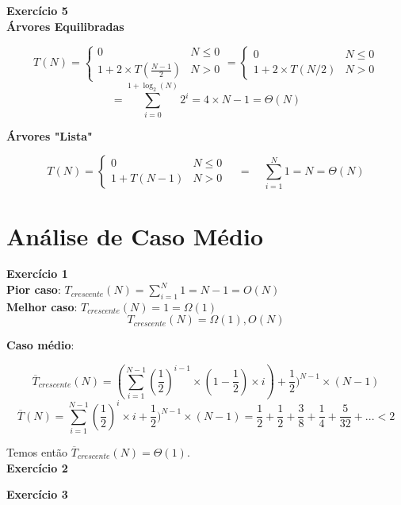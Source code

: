 \documentclass[a4paper,11pt]{article}
\begin{document}
	\noindent \textbf{Exercício 5}\\
	
	\noindent \textbf{Árvores Equilibradas}
	
	\[
		T(N) = 
		\begin{cases}
			0 & N \leq 0 \\
			1 + 2 \times T(\frac{N-1}{2}) & N > 0
		\end{cases}
		=
		\begin{cases}
			0 & N \leq 0 \\
			1 + 2 \times T(N/2) & N > 0
		\end{cases}
	\]
	\[
		= \sum_{i=0}^{1 + \log_2(N)} 2^i = 4 \times N - 1 = \Theta(N)
	\]
	
	\noindent \textbf{Árvores "Lista"}
	
	\[
	T(N) = 
	\begin{cases}
		0 & N \leq 0 \\
		1 + T(N - 1) & N > 0
	\end{cases}
	\quad = \quad \sum_{i=1}^{N} 1 = N = \Theta(N)
	\]
	
	
	
	\section{Análise de Caso Médio}
	
	\noindent \textbf{Exercício 1}\\
	
	\noindent \textbf{Pior caso}: $ T_{crescente}(N) = \sum_{i=1}^{N} 1 = N - 1 = O(N) $\\
	
	\noindent \textbf{Melhor caso}: $ T_{crescente}(N) = 1 = \Omega(1) $\\
	\[
		T_{crescente}(N) = \Omega(1), O(N)
	\]
	
	\noindent \textbf{Caso médio}:
	
	\[
		\overline{T}_{crescente}(N) = (\sum_{i=1}^{N-1} (\frac{1}{2})^{i-1} \times (1-\frac{1}{2}) \times i) + \frac{1}{2})^{N-1} \times (N - 1)
	\]
	\[
		\overline{T}(N) = \sum_{i=1}^{N-1} (\frac{1}{2})^i \times i + \frac{1}{2})^{N-1} \times (N - 1) = \frac{1}{2} + \frac{1}{2} + \frac{3}{8} + \frac{1}{4} + \frac{5}{32} + ... < 2
	\]
	
	\noindent Temos então $ \overline{T}_{crescente}(N) = \Theta(1) $.\\
	
	\noindent \textbf{Exercício 2}
	
	\noindent \textbf{Exercício 3}
	
\end{document}
